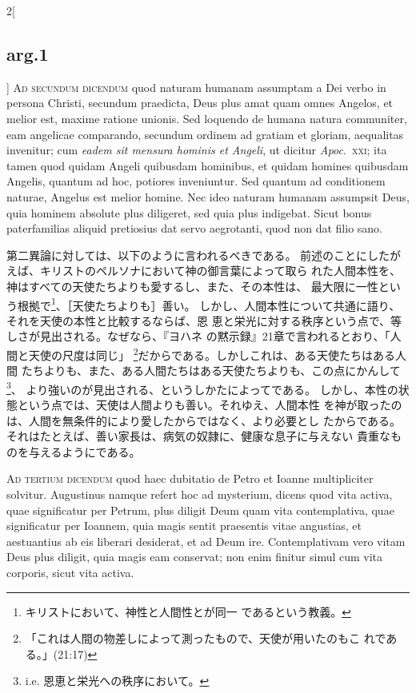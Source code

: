 \documentclass[paper=a4paper,fontsize=10pt,jafontsize=9pt,titlepage]{jlreq}
\begin{document}
\begin{paracol}{2}[\subsection{arg.1}]
{\scshape Ad secundum dicendum} quod naturam humanam assumptam a Dei
 verbo in persona Christi, secundum praedicta, Deus plus amat quam omnes
 Angelos, et melior est, maxime ratione unionis. Sed loquendo de humana
 natura communiter, eam angelicae comparando, secundum ordinem ad
 gratiam et gloriam, aequalitas invenitur; cum {\itshape eadem sit mensura hominis
 et Angeli}, ut dicitur {\itshape Apoc}.~{\scshape xxi}; ita tamen quod quidam Angeli quibusdam
 hominibus, et quidam homines quibusdam Angelis, quantum ad hoc,
 potiores inveniuntur. Sed quantum ad conditionem naturae, Angelus est
 melior homine. Nec ideo naturam humanam assumpsit Deus, quia hominem
 absolute plus diligeret, sed quia plus indigebat. Sicut bonus
 paterfamilias aliquid pretiosius dat servo aegrotanti, quod non dat
 filio sano.

\switchcolumn

第二異論に対しては、以下のように言われるべきである。
前述のことにしたがえば、キリストのペルソナにおいて神の御言葉によって取ら
 れた人間本性を、神はすべての天使たちよりも愛するし、また、その本性は、
最大限に一性という根拠で\footnote{キリストにおいて、神性と人間性とが同一
 であるという教義。}、［天使たちよりも］善い。
しかし、人間本性について共通に語り、それを天使の本性と比較するならば、恩
 恵と栄光に対する秩序という点で、等しさが見出される。なぜなら、『ヨハネ
 の黙示録』21章で言われるとおり、「人間と天使の尺度は同じ」
 \footnote{「これは人間の物差しによって測ったもので、天使が用いたのもこ
 れである。」(21:17)}だからである。しかしこれは、ある天使たちはある人間
 たちよりも、また、ある人間たちはある天使たちよりも、この点にかんして
 \footnote{i.e. 恩恵と栄光への秩序において。}、
 より強いのが見出される、というしかたによってである。
しかし、本性の状態という点では、天使は人間よりも善い。それゆえ、人間本性
 を神が取ったのは、人間を無条件的により愛したからではなく、より必要とし
 たからである。それはたとえば、善い家長は、病気の奴隷に、健康な息子に与えない
 貴重なものを与えるようにである。

\switchcolumn*[\subsection{ad.3}]


{\scshape Ad tertium dicendum} quod haec dubitatio de Petro et Ioanne
 multipliciter solvitur. Augustinus namque refert hoc ad mysterium,
 dicens quod vita activa, quae significatur per Petrum, plus diligit
 Deum quam vita contemplativa, quae significatur per Ioannem, quia magis
 sentit praesentis vitae angustias, et aestuantius ab eis liberari
 desiderat, et ad Deum ire. Contemplativam vero vitam Deus plus diligit,
 quia magis eam conservat; non enim finitur simul cum vita corporis,
 sicut vita activa.


\end{paracol}
\end{document}
